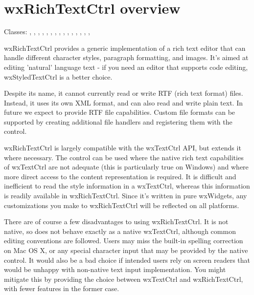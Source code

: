 \section{wxRichTextCtrl overview}\label{wxrichtextctrloverview}

Classes: , , 
, , 
, 
, 
, 
, 
, 
, , 
, , 
, 
, 

wxRichTextCtrl provides a generic implementation of a rich text editor that can handle different character
styles, paragraph formatting, and images. It's aimed at editing 'natural' language text - if you need an editor that supports code editing,
wxStyledTextCtrl is a better choice.

Despite its name, it cannot currently read or write RTF (rich text format) files. Instead, it
uses its own XML format, and can also read and write plain text. In future we expect to provide
RTF file capabilities. Custom file formats can be supported by creating additional
file handlers and registering them with the control.

wxRichTextCtrl is largely compatible with the wxTextCtrl API, but extends it where necessary.
The control can be used where the native rich text capabilities of wxTextCtrl are not
adequate (this is particularly true on Windows) and where more direct access to
the content representation is required. It is difficult and inefficient to read
the style information in a wxTextCtrl, whereas this information is readily
available in wxRichTextCtrl. Since it's written in pure wxWidgets, any customizations
you make to wxRichTextCtrl will be reflected on all platforms.

There are of course a few disadvantages to using wxRichTextCtrl. It is not native,
so does not behave exactly as a native wxTextCtrl, although common editing conventions
are followed. Users may miss the built-in spelling correction on Mac OS X, or any
special character input that may be provided by the native control. It would also
be a bad choice if intended users rely on screen readers that would be unhappy
with non-native text input implementation. You might mitigate this by providing
the choice between wxTextCtrl and wxRichTextCtrl, with fewer features in the
former case.

